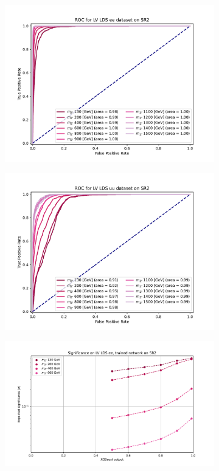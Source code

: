 \documentclass[12pt, a4paper]{book}
\begin{document}
\begin{figure}[!ht]
\begin{subfigure}[b]{0.49\textwidth}
      \includegraphics[width=1\textwidth]{XGBoost/Model_independent/100-150/LV_LDS/ROC_ee.pdf}
   \end{subfigure}
   \hfill
   \begin{subfigure}[b]{0.49\textwidth}
      \centering
      \includegraphics[width=1\textwidth]{XGBoost/Model_independent/100-150/LV_LDS/ROC_uu.pdf}
   \end{subfigure}
   \hfill
	\begin{subfigure}[b]{0.49\textwidth}
      \centering
      \includegraphics[width=1\textwidth]{XGBoost/Model_independent/100-150/LV_LDS/EXP_SIG_ee.pdf}

\end{subfigure}
\end{figure}
\end{document}
